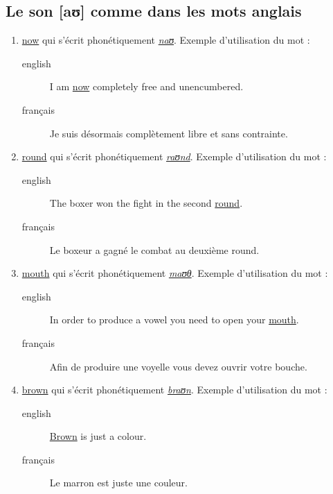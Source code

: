 \documentclass[12pt,a4paper]{book}
\begin{document}
\subsection{Le son [aʊ] comme dans les mots anglais}
\label{sec:org729933e}
\begin{enumerate}
\item \href{http://www.wordreference.com/enfr/now}{now} qui s'écrit phonétiquement \href{https://en.oxforddictionaries.com/definition/now}{\emph{naʊ}}. Exemple d'utilisation du mot :
\begin{description}
\item[{english}] \textenglish{I am \href{https://youtu.be/xcpxjx2fy\_E}{now} completely free and unencumbered.}
\item[{français}] Je suis désormais complètement libre et sans contrainte.
\end{description}
\item \href{http://www.wordreference.com/enfr/round}{round} qui s'écrit phonétiquement \href{https://en.oxforddictionaries.com/definition/round}{\emph{raʊnd}}. Exemple d'utilisation du mot :
\begin{description}
\item[{english}] \textenglish{The boxer won the fight in the second \href{https://youtu.be/oGTBax-Cu4Q}{round}.}
\item[{français}] Le boxeur a gagné le combat au deuxième round.
\end{description}
\item \href{http://www.wordreference.com/enfr/mouth}{mouth} qui s'écrit phonétiquement \href{https://en.oxforddictionaries.com/definition/mouth}{\emph{maʊθ}}. Exemple d'utilisation du mot :
\begin{description}
\item[{english}] \textenglish{In order to produce a vowel you need to open your
\href{https://youtu.be/kkDHKSNrJ5g}{mouth}.}
\item[{français}] Afin de produire une voyelle vous devez ouvrir votre
bouche.
\end{description}
\item \href{http://www.wordreference.com/enfr/brown}{brown} qui s'écrit phonétiquement \href{https://en.oxforddictionaries.com/definition/brown}{\emph{braʊn}}. Exemple d'utilisation du mot :
\begin{description}
\item[{english}] \textenglish{\href{https://youtu.be/OwTXBBU0JLo}{Brown} is just a colour.}
\item[{français}] Le marron est juste une couleur.
\end{description}
\end{enumerate}
\end{document}
